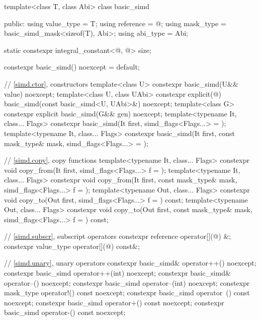 \begin{codeblock}
template<class T, class Abi> class basic_simd {
public:
  using value_type = T;
  using reference = @\seebelow@;
  using mask_type = basic_simd_mask<sizeof(T), Abi>;
  using abi_type = Abi;

  static constexpr integral_constant<@\simdsizetype@, @\seebelow@> size;

  constexpr basic_simd() noexcept = default;

  // \ref{simd.ctor},  constructors
  template<class U> constexpr basic_simd(U&& value) noexcept;
  template<class U, class UAbi>
    constexpr explicit(@\seebelow@) basic_simd(const basic_simd<U, UAbi>&) noexcept;
  template<class G> constexpr explicit basic_simd(G&& gen) noexcept;
  template<typename It, class... Flags>
    constexpr basic_simd(It first, simd_flags<Flags...> = {});
  template<typename It, class... Flags>
    constexpr basic_simd(It first, const mask_type& mask, simd_flags<Flags...> = {});

  // \ref{simd.copy},  copy functions
  template<typename It, class... Flags>
    constexpr void copy_from(It first, simd_flags<Flags...> f = {});
  template<typename It, class... Flags>
    constexpr void copy_from(It first, const mask_type& mask, simd_flags<Flags...> f = {});
  template<typename Out, class... Flags>
    constexpr void copy_to(Out first, simd_flags<Flags...> f = {}) const;
  template<typename Out, class... Flags>
    constexpr void copy_to(Out first, const mask_type& mask, simd_flags<Flags...> f = {}) const;

  // \ref{simd.subscr},  subscript operators
  constexpr reference operator[](@\simdsizetype@) &;
  constexpr value_type operator[](@\simdsizetype@) const&;

  // \ref{simd.unary},  unary operators
  constexpr basic_simd& operator++() noexcept;
  constexpr basic_simd operator++(int) noexcept;
  constexpr basic_simd& operator--() noexcept;
  constexpr basic_simd operator--(int) noexcept;
  constexpr mask_type operator!() const noexcept;
  constexpr basic_simd operator~() const noexcept;
  constexpr basic_simd operator+() const noexcept;
  constexpr basic_simd operator-() const noexcept;

}
\end{codeblock}
